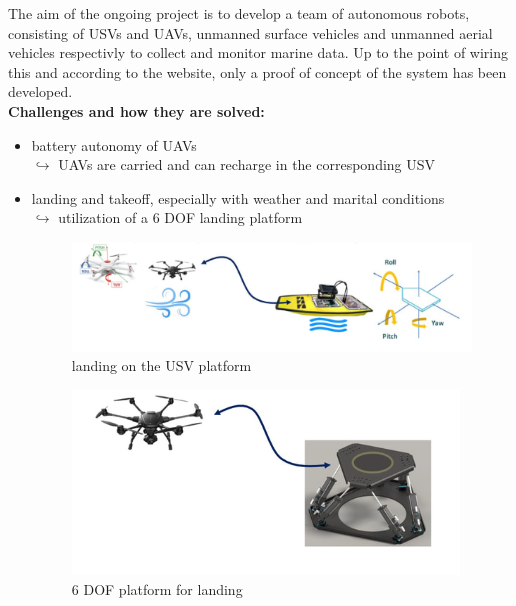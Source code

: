 \documentclass{article}
\begin{document}
The aim of the ongoing project is to develop a team of autonomous robots, consisting of USVs and UAVs, unmanned surface vehicles and unmanned aerial vehicles respectivly to collect and monitor marine data. Up to the point of wiring this and according to the website, only a proof of concept of the system has been developed. \vspace{5pt} \\ 
\textbf{Challenges and how they are solved:}
\begin{itemize}
	\item battery autonomy of UAVs \\
	$\hookrightarrow$ UAVs are carried and can recharge in the corresponding USV
	\item landing and takeoff, especially with weather and marital conditions \\
	$\hookrightarrow$ utilization of a 6 DOF landing platform
	
	\begin{figure}[htbp]
		\centerline{\includegraphics[scale=1]{tarmem-landing.png}}
		\caption{landing on the USV platform}
		\label{fig3}
	\end{figure}

\begin{figure}[htbp]
	\centerline{\includegraphics[scale=1]{tarmem-landing-platform.png}}
	\caption{6 DOF platform for landing}
	\label{fig4}
\end{figure}
	

\end{itemize}
\end{document}

